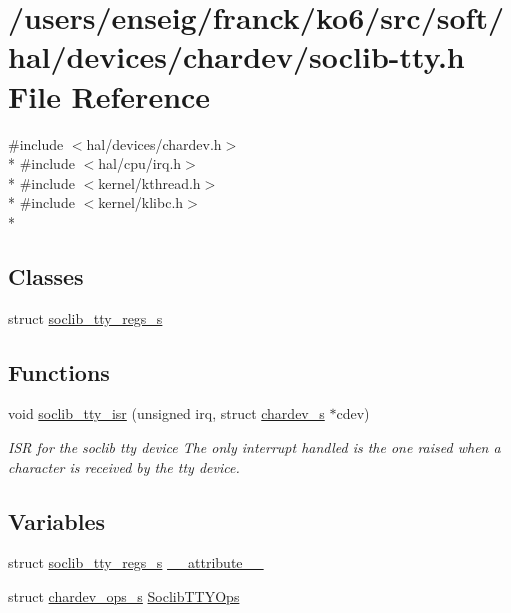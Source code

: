 \hypertarget{soclib-tty_8h}{\section{/users/enseig/franck/ko6/src/soft/hal/devices/chardev/soclib-\/tty.h File Reference}
\label{soclib-tty_8h}
}
{\ttfamily \#include $<$hal/devices/chardev.\-h$>$}\\*
{\ttfamily \#include $<$hal/cpu/irq.\-h$>$}\\*
{\ttfamily \#include $<$kernel/kthread.\-h$>$}\\*
{\ttfamily \#include $<$kernel/klibc.\-h$>$}\\*
\subsection*{Classes}
\begin{DoxyCompactItemize}
\item 
struct \hyperlink{structsoclib__tty__regs__s}{soclib\-\_\-tty\-\_\-regs\-\_\-s}
\end{DoxyCompactItemize}
\subsection*{Functions}
\begin{DoxyCompactItemize}
\item 
void \hyperlink{soclib-tty_8h_abee08020bafa1f698839a8d477dcdafa}{soclib\-\_\-tty\-\_\-isr} (unsigned irq, struct \hyperlink{structchardev__s}{chardev\-\_\-s} $\ast$cdev)
\begin{DoxyCompactList}\small\item\em I\-S\-R for the soclib tty device The only interrupt handled is the one raised when a character is received by the tty device. \end{DoxyCompactList}\end{DoxyCompactItemize}
\subsection*{Variables}
\begin{DoxyCompactItemize}
\item 
struct \hyperlink{structsoclib__tty__regs__s}{soclib\-\_\-tty\-\_\-regs\-\_\-s} \hyperlink{soclib-tty_8h_a1d3bdc9d877594ceaf22370e6cb9a58a}{\-\_\-\-\_\-attribute\-\_\-\-\_\-}
\item 
struct \hyperlink{structchardev__ops__s}{chardev\-\_\-ops\-\_\-s} \hyperlink{soclib-tty_8h_ac60ea3e14652d47e0814fac85c18b2ff}{Soclib\-T\-T\-Y\-Ops}
\end{DoxyCompactItemize}


